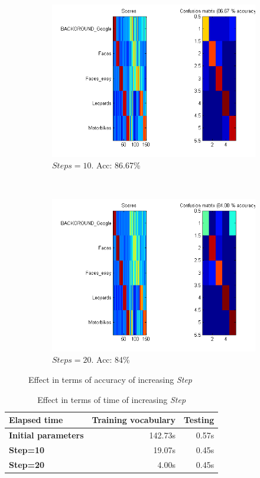 \begin{figure}[htb]
	\begin{subfigure}[t]{0.4\textwidth}
		\includegraphics[width=\textwidth]{./img/ex1/eval-steps-10.png}
		\caption{$ Steps=10 $. Acc: 86.67\%}
	\end{subfigure}
	~
	\begin{subfigure}[t]{0.4\textwidth}
		\includegraphics[width=\textwidth]{./img/ex1/eval-steps-20.png}
		\caption{$ Steps=20 $. Acc: 84\%}
	\end{subfigure}
\caption{Effect in terms of accuracy of increasing \emph{Step}}
\label{fig:effect-steps-accuracy}
\end{figure}

\begin{table}[htb]
	\centering
	\begin{tabular}{l|rr}
		{\bfseries Elapsed time} 			 & {\bfseries Training vocabulary} & {\bfseries Testing} \\ \hline
		{\bfseries Initial parameters} & 142.73s												 & 0.57s \\
		{\bfseries Step=10}            & 19.07s												   & 0.45s \\
		{\bfseries Step=20}            & 4.00s												   & 0.45s \\
	\end{tabular}
	\caption{Effect in terms of time of increasing \emph{Step}}
	\label{tab:effect-steps-time}
\end{table}

